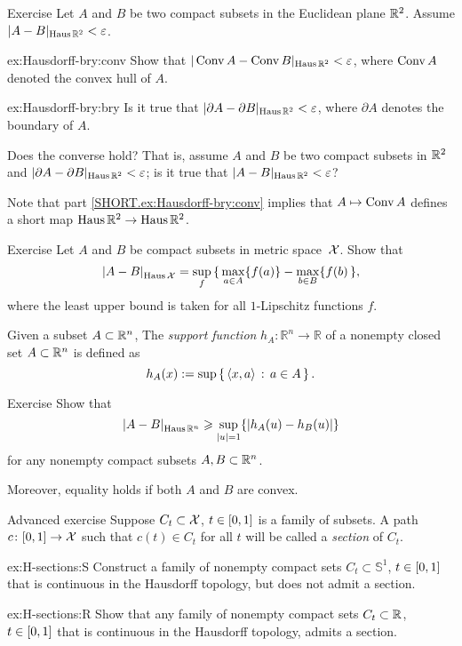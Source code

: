 \begin{thm}{Exercise}\label{ex:Hausdorff-bry}
Let $A$ and $B$ be two compact subsets in the Euclidean plane $\mathbb{R}^2$.
Assume $|A-B|_{\operatorname{\rm Haus}\nolimits\mathbb{R}^2}<\varepsilon$.

\begin{subthm}{ex:Hausdorff-bry:conv}
Show that $|\mathop{\rm Conv}\nolimits A-\mathop{\rm Conv}\nolimits B|_{\operatorname{\rm Haus}\nolimits\mathbb{R}^2}<\varepsilon$, where $\mathop{\rm Conv}\nolimits A$ denoted the convex hull of $A$.
\end{subthm}
\begin{subthm}{ex:Hausdorff-bry:bry}
Is it true that
$|\partial A-\partial B|_{\operatorname{\rm Haus}\nolimits\mathbb{R}^2}<\varepsilon$,
where $\partial A$ denotes the boundary of $A$.

Does the converse hold? That is, assume $A$ and $B$ be two compact subsets in $\mathbb{R}^2$
and $|\partial A-\partial B|_{\operatorname{\rm Haus}\nolimits\mathbb{R}^2}<\varepsilon$; 
is it true that $|A-B|_{\Haus\RR^2}\z<\eps$?
\end{subthm}

\end{thm}

Note that part \ref{SHORT.ex:Hausdorff-bry:conv} implies that $A\mapsto \mathop{\rm Conv}\nolimits A$ defines a short map $\operatorname{\rm Haus}\nolimits\mathbb{R}^2\to \operatorname{\rm Haus}\nolimits\mathbb{R}^2$. 

\begin{thm}{Exercise}\label{ex:Haus-func}
Let $A$ and $B$ be compact subsets in metric space~$\mathcal{X}$.
Show that 
\[\dist{A}{B}{\Haus\spc{X}}=\sup_f\, \{\,\max_{a\in A}\{f(a)\}-\max_{b\in B}\{f(b)\,\},\]
where the least upper bound is taken for all $1$-Lipschitz functions $f$.

\end{thm}

Given a subset $A\subset \mathbb{R}^n$,
The \emph{support function} $h_A\colon\mathbb{R}^n\to\mathbb{R}$ of a  nonempty closed set $A\subset \mathbb{R}^n$ is defined as 
\[h_A(x)
\mathrel{:=}
\sup\left\{\,{\langle x, a\rangle}\,:\,{a\in A}\,\right\}.\]

\begin{thm}{Exercise}\label{ex:Haus-support}
Show that 
\[\dist{A}{B}{\Haus\RR^n}\ge \sup_{|u|=1}\{|h_A(u)-h_B(u)|\}\]
for any nonempty compact subsets $A,B\subset \mathbb{R}^n$.

Moreover, equality holds if both $A$ and $B$ are convex.
\end{thm}


\begin{thm}{Advanced exercise}\label{ex:H-sections}
Suppose $C_t\subset \mathcal{X}$, $t\z\in [0,1]$ is a family of subsets.
A path $c\colon[0,1]\to \mathcal{X}$ such that $c(t)\in C_t$ for all $t$ will be called a {}\emph{section} of $C_t$.

\begin{subthm}{ex:H-sections:S}
Construct a family of nonempty compact sets $C_t\subset\mathbb{S}^1$, $t\z\in [0,1]$ that is continuous in the Hausdorff topology, 
but does not admit a section.
\end{subthm}

\begin{subthm}{ex:H-sections:R}
Show that any family of nonempty compact sets $C_t\subset\mathbb{R}$, $t\z\in [0,1]$ that is continuous in the Hausdorff topology, 
admits a section.
\end{subthm}

\end{thm}

